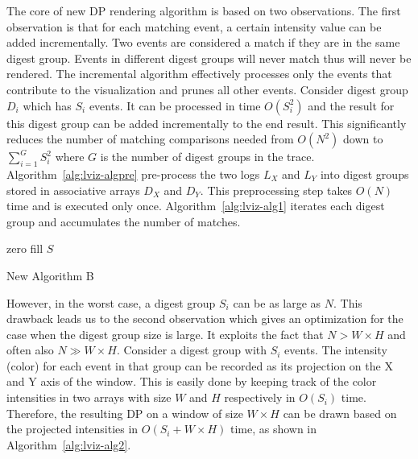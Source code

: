 The core of new DP rendering algorithm is based on two observations.
The first observation is that for each matching event,
a certain intensity value can be added incrementally.
Two events are considered a match if they are in the same digest group.
Events in different digest groups will never match thus will never be rendered.
The incremental algorithm effectively processes only the events
that contribute to the visualization and prunes all other events.
Consider digest group $D_i$ which has $S_i$ events.
It can be processed in time $O(S_i^2)$
and the result for this digest group can be added incrementally to the 
end result.
This significantly reduces the number of matching comparisons needed
from $O(N^2)$ down to $\sum_{i=1}^{G} S_i^2$
where $G$ is the number of digest groups in the trace.
Algorithm~\ref{alg:lviz-algpre} pre-process the two logs $L_X$ and $L_Y$
into digest groups stored in associative arrays $D_X$ and $D_Y$.
This preprocessing step takes $O(N)$ time and is executed only once.
Algorithm~\ref{alg:lviz-alg1} iterates each digest group and accumulates
the number of matches.

\begin{algorithm}[htb]
\BlankLine
zero fill $S$\;
\caption{New Algorithm B}
\label{alg:lviz-alg2}
\end{algorithm}

However, in the worst case, a digest group $S_i$ can be as large as $N$.
This drawback leads us to the second observation which
gives an optimization for the case when the digest group size is large.
It exploits the fact that $N > W\times H$ and often also $N \gg W\times H$.
Consider a digest group with $S_i$ events.
The intensity (color) for each event in that group can be recorded as
its projection on the X and Y axis of the window.
This is easily done by keeping track of the color intensities in
two arrays with size $W$ and $H$ respectively in $O(S_i)$ time.
Therefore, the resulting DP on a window of size $W \times H$
can be drawn based on the projected intensities in $O(S_i + W\times H)$ time,
as shown in Algorithm~\ref{alg:lviz-alg2}.

